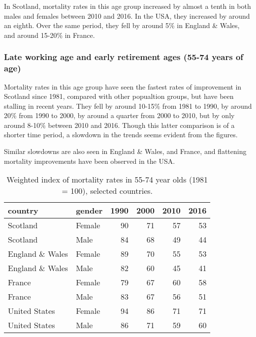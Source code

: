 \documentclass[]{article}
\begin{document}
In Scotland, mortality rates in this age group increased by almost a
tenth in both males and females between 2010 and 2016. In the USA, they
increased by around an eighth. Over the same period, they fell by around
5\% in England \& Wales, and around 15-20\% in France.

\subsubsection{Late working age and early retirement ages (55-74 years
of
age)}\label{late-working-age-and-early-retirement-ages-55-74-years-of-age}

Mortality rates in this age group have seen the fastest rates of
improvement in Scotland since 1981, compared with other popualtion
groups, but have been stalling in recent years. They fell by around
10-15\% from 1981 to 1990, by around 20\% from 1990 to 2000, by around a
quarter from 2000 to 2010, but by only around 8-10\% between 2010 and
2016. Though this latter comparison is of a shorter time period, a
slowdown in the trends seems evident from the figures.

Similar slowdowns are also seen in England \& Wales, and France, and
flattening mortality improvements have been observed in the USA.

\begin{table}

\caption{\label{tab:unnamed-chunk-8}Weighted index of mortality rates in 55-74 year olds (1981 = 100), selected countries.}
\centering
\begin{tabular}[t]{l|l|r|r|r|r}
\hline
country & gender & 1990 & 2000 & 2010 & 2016\\
\hline
Scotland & Female & 90 & 71 & 57 & 53\\
\hline
Scotland & Male & 84 & 68 & 49 & 44\\
\hline
England \& Wales & Female & 89 & 70 & 55 & 53\\
\hline
England \& Wales & Male & 82 & 60 & 45 & 41\\
\hline
France & Female & 79 & 67 & 60 & 58\\
\hline
France & Male & 83 & 67 & 56 & 51\\
\hline
United States & Female & 94 & 86 & 71 & 71\\
\hline
United States & Male & 86 & 71 & 59 & 60\\
\hline
\end{tabular}
\end{table}
\end{document}
